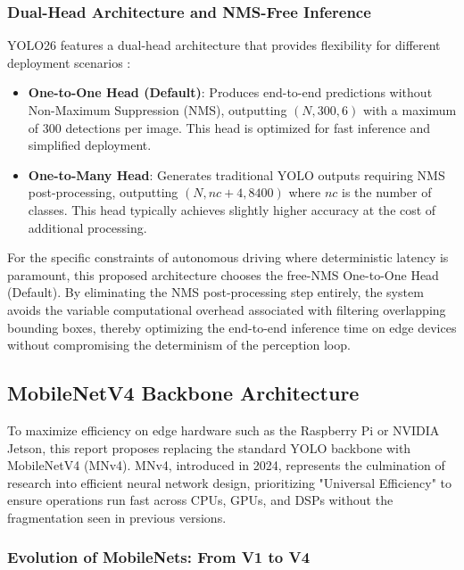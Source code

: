 \subsubsection{Dual-Head Architecture and NMS-Free Inference}

YOLO26 features a dual-head architecture that provides flexibility for different deployment scenarios \cite{yolo26}:
\begin{itemize}
    \item \textbf{One-to-One Head (Default)}: Produces end-to-end predictions without Non-Maximum Suppression (NMS), outputting $(N, 300, 6)$ with a maximum of 300 detections per image. This head is optimized for fast inference and simplified deployment.
    \item \textbf{One-to-Many Head}: Generates traditional YOLO outputs requiring NMS post-processing, outputting $(N, nc + 4, 8400)$ where $nc$ is the number of classes. This head typically achieves slightly higher accuracy at the cost of additional processing.
\end{itemize}

For the specific constraints of autonomous driving where deterministic latency is paramount, this proposed architecture chooses the free-NMS One-to-One Head (Default). By eliminating the NMS post-processing step entirely, the system avoids the variable computational overhead associated with filtering overlapping bounding boxes, thereby optimizing the end-to-end inference time on edge devices without compromising the determinism of the perception loop.

\subsection{MobileNetV4 Backbone Architecture}
To maximize efficiency on edge hardware such as the Raspberry Pi or NVIDIA Jetson, this report proposes replacing the standard YOLO backbone with MobileNetV4 (MNv4). MNv4, introduced in 2024, represents the culmination of research into efficient neural network design, prioritizing "Universal Efficiency" to ensure operations run fast across CPUs, GPUs, and DSPs without the fragmentation seen in previous versions.
\subsubsection{Evolution of MobileNets: From V1 to V4}

